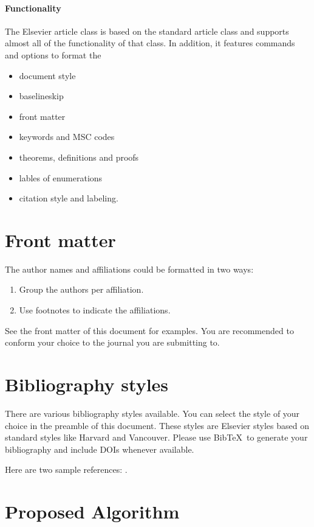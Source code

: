 \documentclass[review]{elsarticle}
\begin{document}
\paragraph{Functionality} The Elsevier article class is based on the standard article class and supports almost all of the functionality of that class. In addition, it features commands and options to format the
\begin{itemize}
\item document style
\item baselineskip
\item front matter
\item keywords and MSC codes
\item theorems, definitions and proofs
\item lables of enumerations
\item citation style and labeling.
\end{itemize}

\section{Front matter}

The author names and affiliations could be formatted in two ways:
\begin{enumerate}[(1)]
\item Group the authors per affiliation.
\item Use footnotes to indicate the affiliations.
\end{enumerate}
See the front matter of this document for examples. You are recommended to conform your choice to the journal you are submitting to.

\section{Bibliography styles}

There are various bibliography styles available. You can select the style of your choice in the preamble of this document. These styles are Elsevier styles based on standard styles like Harvard and Vancouver. Please use Bib\TeX\ to generate your bibliography and include DOIs whenever available.

Here are two sample references: \cite{Feynman1963118,Dirac1953888}.

\section{Proposed Algorithm}
\end{document}
